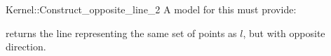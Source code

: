 \begin{ccRefFunctionObjectConcept}{Kernel::Construct_opposite_line_2}
A model for this must provide:


{returns the line representing the same set of points as $l$,
but with opposite direction.}

\end{ccRefFunctionObjectConcept}
